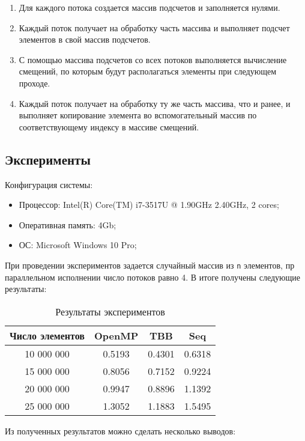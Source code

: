 \documentclass{report}
\begin{document}
\begin{enumerate} 

\item Для каждого потока создается массив подсчетов и заполняется нулями.
\item Каждый поток получает на обработку часть массива и выполняет подсчет элементов в свой массив подсчетов.
\item С помощью массива подсчетов со всех потоков выполняется вычисление смещений, по которым будут располагаться элементы при следующем проходе.
\item Каждый поток получает на обработку ту же часть массива, что и ранее,  и выполняет копирование элемента во вспомогательный массив по соответствующему индексу в массиве смещений.

\end{enumerate} 
\newpage

\begin{center}\section*{Эксперименты}\end{center}
Конфигурация системы:
\begin{itemize}
\item Процессор: Intel(R) Core(TM) i7-3517U @ 1.90GHz 2.40GHz, 2 cores;
\item Оперативная память: 4Gb;
\item ОС: Microsoft Windows 10 Pro;
\end{itemize}
\par При проведении экспериментов задается случайный массив из \verb|n| элементов, пр параллельном исполнении число потоков равно 4. В итоге получены следующие результаты:
\begin{table}[h!]
\centering
 \begin{tabular}{||c c c c||} 
 \hline
 Число элементов & OpenMP & TBB & Seq \\ [0.5ex] 
 \hline\hline
 10 000 000 & 0.5193 & 0.4301 & 0.6318 \\ 
 15 000 000 &  0.8056 &  0.7152 & 0.9224 \\
 20 000 000 & 0.9947 &  0.8896 & 1.1392 \\
 25 000 000 & 1.3052 & 1.1883 & 1.5495 \\ [1ex] 
 \hline
 \end{tabular}
 \caption{Результаты экспериментов}
\end{table}
\par Из полученных результатов можно сделать несколько выводов:
\end{document}
